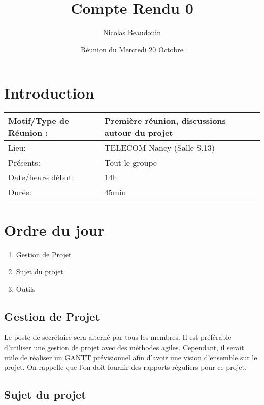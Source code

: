 \documentclass[french]{article}
\title{Compte Rendu 0}
\author{Nicolas Beaudouin}
\date{Réunion du Mercredi 20 Octobre}
\begin{document}
\maketitle

\section*{Introduction}
\begin{flushleft}
 \begin{tabular}{|m{4cm}|m{8cm}|}
    \hline
    Motif/Type de Réunion :  & Première réunion, discussions autour du projet \\
    \hline
    Lieu:  & TELECOM Nancy (Salle S.13) \\
    \hline
    Présents:  & Tout le groupe \\
    \hline \hline
    Date/heure début:  & 14h \\
    \hline
    Durée: & 45min \\
    \hline
 \end{tabular}
\end{flushleft}

\section*{Ordre du jour}

\begin{enumerate}
    \item Gestion de Projet \\
    \item Sujet du projet \\
    \item Outils \\
\end{enumerate}


\subsection*{Gestion de Projet}

Le poste de secrétaire sera alterné par tous les membres. Il est préférable d'utiliser une gestion de projet avec des méthodes agiles. Cependant, il serait utile de réaliser un GANTT prévisionnel afin d'avoir une vision d'ensemble sur le projet.
On rappelle que l'on doit fournir des rapports réguliers pour ce projet.


\subsection*{Sujet du projet}
\end{document}
